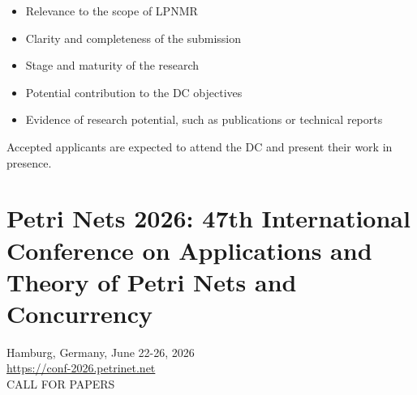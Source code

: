 \documentclass[prodmode,acmtecs]{acmsmall} %
\begin{document}
\begin{itemize}
\begin{itemize}\item  Relevance to the scope of LPNMR
\item  Clarity and completeness of the submission
\item  Stage and maturity of the research
\item  Potential contribution to the DC objectives
\item  Evidence of research potential, such as publications or technical reports
\end{itemize} 
  Accepted applicants are expected to attend the DC and present their work in presence.  
 
\end{itemize}\section{Petri Nets 2026: 47th International Conference on Applications and Theory of Petri Nets and Concurrency}\label{PetriNets2026}  Hamburg, Germany, June 22-26, 2026\\ 
  \href{https://conf-2026.petrinet.net}{https://conf-2026.petrinet.net}\\ 
CALL FOR PAPERS 
\end{document}
